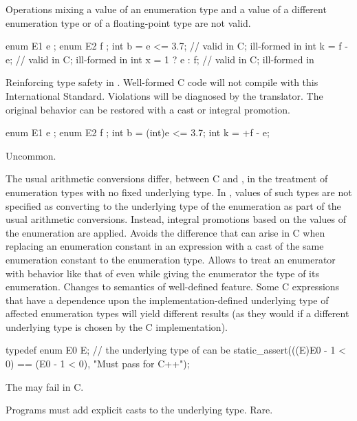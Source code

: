 \change
Operations mixing a value of an enumeration type and a value of a different
enumeration type or of a floating-point type are not valid.
\begin{example}
\begin{codeblock}
enum E1 { e };
enum E2 { f };
int b = e <= 3.7;       // valid in C; ill-formed in \Cpp{}
int k = f - e;          // valid in C; ill-formed in \Cpp{}
int x = 1 ? e : f;      // valid in C; ill-formed in \Cpp{}
\end{codeblock}
\end{example}
\rationale
Reinforcing type safety in \Cpp{}.
\effect
Well-formed C code will not compile with this International Standard.
\difficulty
Violations will be diagnosed by the \Cpp{} translator.
The original behavior can be restored with a cast or integral promotion.
\begin{example}
\begin{codeblock}
enum E1 { e };
enum E2 { f };
int b = (int)e <= 3.7;
int k = +f - e;
\end{codeblock}
\end{example}
\howwide
Uncommon.

\change
The usual arithmetic conversions differ, between C and \Cpp{},
in the treatment of enumeration types with no fixed underlying type.
In \Cpp{}, values of such types are not specified
as converting to the underlying type of the enumeration
as part of the usual arithmetic conversions.
Instead, integral promotions
based on the values of the enumeration are applied.
\rationale
Avoids the difference that can arise in C
when replacing an enumeration constant in
an expression with a cast of the same enumeration constant
to the enumeration type.
Allows \Cpp{} to treat an enumerator with behavior
like that of 
even while giving the enumerator the type of its enumeration.
\effect
Changes to semantics of well-defined feature.
Some C expressions that have a dependence upon
the implementation-defined
underlying type of affected enumeration types
will yield different results
(as they would if a different underlying type
is chosen by the C implementation).
\begin{example}
\begin{codeblock}
typedef enum { E0 } E;      // the underlying type of  can be 
static_assert(((E)E0 - 1 < 0) == (E0 - 1 < 0), "Must pass for C++");
\end{codeblock}
The  may fail in C.
\end{example}
\difficulty
Programs must add explicit casts to the underlying type.
\howwide
Rare.

